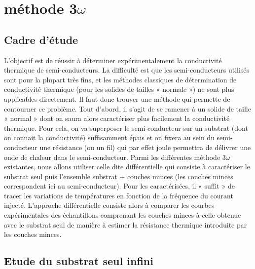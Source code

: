 \documentclass[10pt,a4paper]{report}
\begin{document}
\chapter{méthode 3$\omega$}
\section{Cadre d'étude}
L’objectif est de réussir à déterminer expérimentalement la conductivité thermique de semi-conducteurs. La difficulté est que les semi-conducteurs utilisés sont pour la plupart très fins, et les méthodes classiques de détermination de conductivité thermique (pour les solides de tailles « normale ») ne sont plus applicables directement. Il faut donc trouver une méthode qui permette de contourner ce problème. Tout d’abord, il s’agit de se ramener à un solide de taille « normal » dont on saura alors caractériser plus facilement la conductivité thermique. Pour cela, on va superposer le semi-conducteur sur un substrat (dont on connait la conductivité) suffisamment épais et on fixera au sein du semi-conducteur une résistance (ou un fil) qui par effet joule permettra de délivrer une onde de chaleur dans le semi-conducteur. Parmi les différentes méthode 3$\omega$ existantes, nous allons utiliser celle dite différentielle qui consiste à caractériser le substrat seul puis l’ensemble substrat + couches minces (les couches minces correspondent ici au semi-conducteur). Pour les caractérisées, il « suffit » de tracer les variations de températures en fonction de la fréquence du courant injecté. L'approche différentielle consiste alors à comparer les courbes expérimentales des échantillons comprenant les couches minces à celle obtenue avec le substrat seul de manière à estimer la résistance thermique introduite par les couches minces.
\section{Etude du substrat seul infini}
\end{document}
